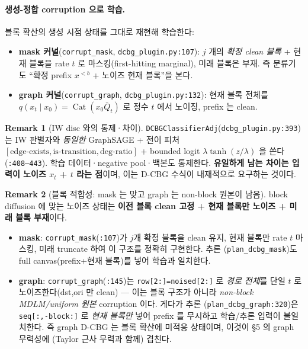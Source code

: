 \documentclass[11pt]{article}
\newcommand{\code}[1]{\texttt{\small #1}}
\newcommand{\xpre}{x^{<b}}
\newcommand{\Qb}{\bar{Q}}
\DeclareMathOperator{\Cat}{Cat}
\theoremstyle{plain}
\theoremstyle{definition}
\newtheorem{remark}{Remark}
\begin{document}
\paragraph{생성-정합 corruption 으로 학습.}
블록 확산의 생성 시점 상태를 그대로 재현해 학습한다:
\begin{itemize}[nosep,leftmargin=1.4em]
  \item \textbf{mask 커널}(\code{corrupt\_mask}, \code{dcbg\_plugin.py:107}):
  $j$ 개의 \emph{확정 clean 블록} + 현재 블록을 rate $t$ 로 마스킹(first-hitting marginal),
  미래 블록은 부재. 즉 분류기도 ``확정 prefix $\xpre$ + 노이즈 현재 블록''을 본다.
  \item \textbf{graph 커널}(\code{corrupt\_graph}, \code{dcbg\_plugin.py:132}):
  현재 블록 전체를 $q(x_t\mid x_0)=\Cat(x_0\Qb_t)$ 로 정수 $t$ 에서 노이징, prefix 는 clean.
\end{itemize}

\begin{remark}[IW disc 와의 통제·차이]
\code{DCBGClassifierAdj}(\code{dcbg\_plugin.py:393})는 IW 판별자와 \emph{동일한}
GraphSAGE + 전이 피처$[\text{edge-exists},\text{is-transition},\text{deg-ratio}]$
+ bounded logit $\lambda\tanh(z/\lambda)$ 을 쓴다(\code{:408--443}). 학습 데이터·negative pool·백본도 통제한다.
\textbf{유일하게 남는 차이는 입력이 노이즈 $x_t$ + $t$ 라는 점}이며, 이는 D-CBG 수식이 내재적으로 요구하는 것이다.
\end{remark}

\begin{remark}[블록 적합성: mask 는 맞고 graph 는 non-block 원본이 남음]\label{rem:blockfit}
block diffusion 에 맞는 노이즈 상태는 \textbf{이전 블록 clean 고정 + 현재 블록만 노이즈 + 미래 블록 부재}이다.
\begin{itemize}[nosep,leftmargin=1.4em]
  \item \textbf{mask}: \code{corrupt\_mask}(\code{:107})가 $j$개 확정 블록을 clean 유지,
  현재 블록만 rate $t$ 마스킹, 미래 truncate 하여 이 구조를 정확히 구현한다. 추론
  (\code{plan\_dcbg\_mask})도 full canvas(prefix+현재 블록)를 넣어 학습과 일치한다.
  \item \textbf{graph}: \code{corrupt\_graph}(\code{:145})는 \code{row[2:]=noised[2:]} 로
  \emph{경로 전체}를 단일 $t$ 로 노이즈한다(dst,ori 만 clean) — 이는 블록 구조가 아니라
  \emph{non-block MDLM/uniform 원본} corruption 이다. 게다가 추론
  (\code{plan\_dcbg\_graph:320})은 \code{seq[:,-block:]} 로 \emph{현재 블록만} 넣어
  prefix 를 무시하고 학습/추론 입력이 불일치한다. 즉 graph D-CBG 는 블록 확산에 미적응 상태이며,
  이것이 §5 의 graph 무력성에 (Taylor 근사 무력과 함께) 겹친다.
\end{itemize}
\end{remark}
\end{document}
